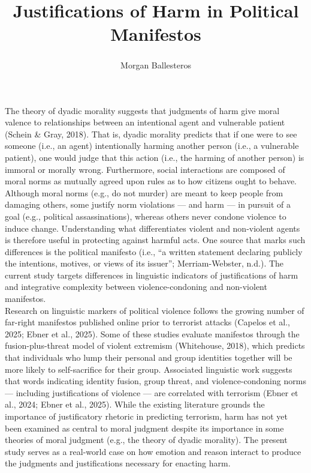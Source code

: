 \documentclass[
  english,
  man]{apa6}
\title{Justifications of Harm in Political Manifestos}
\author{Morgan Ballesteros\textsuperscript{}}
\date{}
\affiliation{\vspace{0.5cm}\textsuperscript{} University of Chicago}
\begin{document}
\maketitle

The theory of dyadic morality suggests that judgments of harm give moral valence to
relationships between an intentional agent and vulnerable patient (Schein \& Gray, 2018).
That is, dyadic morality predicts that if one were to see someone (i.e., an agent) intentionally harming another person (i.e., a vulnerable patient), one would judge that this action (i.e., the harming of another person) is immoral or morally wrong. Furthermore, social interactions are composed of moral norms as mutually agreed upon rules as to how citizens ought to behave. Although moral norms (e.g., do not murder) are meant to keep people from damaging others, some justify norm violations --- and harm --- in pursuit of a goal (e.g., political assassinations), whereas others never condone violence to induce change. Understanding what differentiates violent and non-violent agents is therefore useful in protecting against harmful acts. One source that marks such differences is the political manifesto (i.e., ``a written statement declaring publicly the intentions, motives, or views of its issuer''; Merriam-Webster, n.d.). The current study targets differences in linguistic indicators of justifications of harm and integrative complexity between violence-condoning and non-violent manifestos.\\
Research on linguistic markers of political violence follows the growing number of far-right
manifestos published online prior to terrorist attacks (Capelos et al., 2025; Ebner et al.,
2025). Some of these studies evaluate manifestos through the fusion-plus-threat model of
violent extremism (Whitehouse, 2018), which predicts that individuals who lump their personal
and group identities together will be more likely to self-sacrifice for their group.
Associated linguistic work suggests that words indicating identity fusion, group threat, and
violence-condoning norms --- including justifications of violence --- are correlated with
terrorism (Ebner et al., 2024; Ebner et al., 2025). While the existing literature grounds the
importance of justificatory rhetoric in predicting terrorism, harm has not yet been examined
as central to moral judgment despite its importance in some theories of moral judgment (e.g.,
the theory of dyadic morality). The present study serves as a real-world case on how emotion
and reason interact to produce the judgments and justifications necessary for enacting harm.
\end{document}
